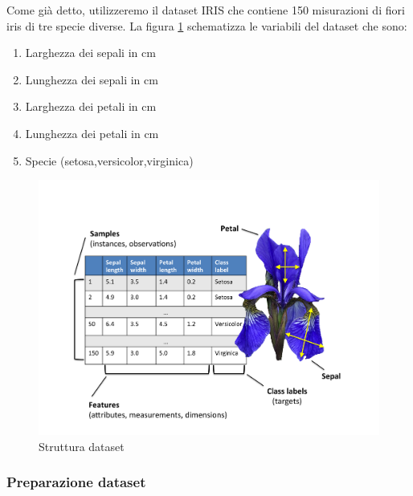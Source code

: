 \documentclass[12pt]{article}
\begin{document}
		Come già detto, utilizzeremo il dataset IRIS che contiene 150 misurazioni di fiori iris di tre specie diverse. La figura \ref{fig:iris} schematizza le variabili del dataset che sono:
		\begin{enumerate}
			\item Larghezza dei sepali in cm
			\item Lunghezza dei sepali in cm
			\item Larghezza dei petali in cm
			\item Lunghezza dei petali in cm
			\item Specie (setosa,versicolor,virginica)
		\end{enumerate}
		\begin{figure}
			\begin{center}
				\includegraphics[scale=.1]{iris}
				\caption{Struttura dataset}
				\label{fig:iris}
			\end{center}
		\end{figure}

		\subsubsection{Preparazione dataset}
\end{document}
